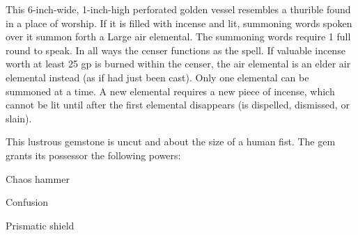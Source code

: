 {

\begin{comment}
Carpet of Flying:} This rug is able to fly through the air as if affected by an overland flight spell of unlimited duration. The size, carrying capacity, and speed of the different carpets of flying are shown on the table below. Beautifully and intricately made, each carpet has its own command word to activate it - if the device is within voice range, the command word activates it, whether the speaker is on the rug or not. The carpet is then controlled by spoken directions.

Size & Capacity & Speed & Weight & Market Price \\
5 ft. by 5 ft. & 200 lb. & 40 ft. & 8 lb. & 20,000 gp \\
5 ft. by 10 ft. & 400 lb. & 40 ft. & 15 lb. & 35,000 gp \\
10 ft. by 10 ft. & 800 lb. & 40 ft. & 10 lb. & 60,000 gp &

A carpet of flying can carry up to double its capacity, but doing so reduces its speed to 30 feet. It has average maneuverability, but a carpet of flying can still hover.

Moderate transmutation; CL 10th; Craft Wondrous Item, overland flight, permanency.
\end{comment}

 This 6-inch-wide, 1-inch-high perforated golden vessel resembles a thurible found in a place of worship. If it is filled with incense and lit, summoning words spoken over it summon forth a Large air elemental. The summoning words require 1 full round to speak. In all ways the censer functions as the  spell. If valuable incense worth at least 25 gp is burned within the censer, the air elemental is an elder air elemental instead (as if  had just been cast). Only one elemental can be summoned at a time. A new elemental requires a new piece of incense, which cannot be lit until after the first elemental disappears (is dispelled, dismissed, or slain).


 This lustrous gemstone is uncut and about the size of a human fist. The gem grants its possessor the following powers:
\begin{itemize*}
\item Chaos hammer
\item Confusion
\item Prismatic shield
\end{itemize*}

}
